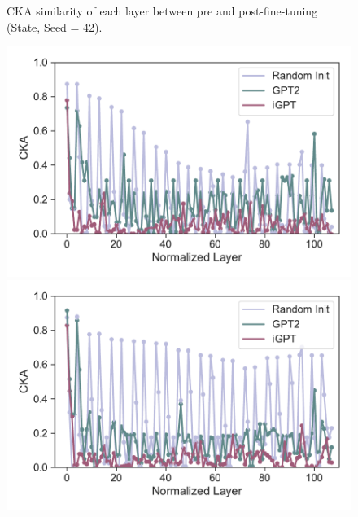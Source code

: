\documentclass{article}
\begin{document}
\begin{figure}[H]
\begin{minipage}[b]{0.32\linewidth}
    \end{minipage}
    \caption{CKA similarity of each layer between pre and post-fine-tuning (State, Seed = 42).}
\end{figure}

\begin{figure}[H]
    \centering
    \begin{minipage}[b]{0.32\linewidth}
        \includegraphics[width=\linewidth]{figs/cka_plot_40_gpt2_igpt_dt_hopper_medium_42_action.pdf}
    \end{minipage}
    \begin{minipage}[b]{0.32\linewidth}
        \includegraphics[width=\linewidth]{figs/cka_plot_40_gpt2_igpt_dt_halfcheetah_medium_42_action.pdf}
    \end{minipage}
    \begin{minipage}[b]{0.32\linewidth}

\end{minipage}
\end{figure}
\end{document}
